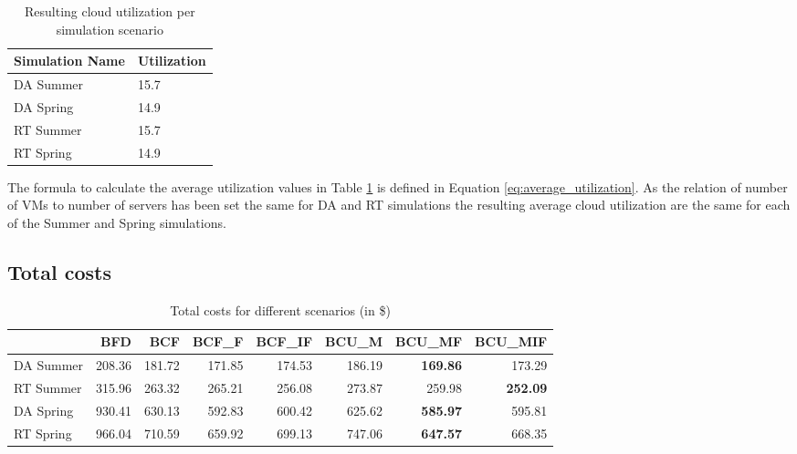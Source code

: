\begin{table}[htbp]
\centering
\begin{tabular}[\textwidth]{ll}
\toprule
	Simulation Name & Utilization  \\
\midrule
	DA Summer & 15.7 \\
	DA Spring & 14.9 \\
	RT Summer & 15.7 \\
	RT Spring & 14.9 \\
\bottomrule
\end{tabular}
\caption{Resulting cloud utilization per simulation scenario}
\label{tab:cloud_utilization_per_simulation_scenario}
\end{table}

The formula to calculate the average utilization values in Table \ref{tab:cloud_utilization_per_simulation_scenario} is defined in Equation \ref{eq:average_utilization}.
As the relation of number of VMs to number of servers has been set the same for DA and RT simulations the resulting average cloud utilization are the same for each of the Summer and Spring simulations. 

\subsection{Total costs}


\begin{table}[ht]
\centering
\begin{tabular}{lrrrrrrr}
\toprule
{} &     BFD &     BCF &   BCF\_F &  BCF\_IF &   BCU\_M &  BCU\_MF &  BCU\_MIF \\
\midrule
DA Summer &  208.36 &  181.72 &  171.85 &  174.53 &  186.19 &  \textbf{169.86} &   173.29 \\
RT Summer &  315.96 &  263.32 &  265.21 &  256.08 &  273.87 &  259.98 &   \textbf{252.09} \\
DA Spring &  930.41 &  630.13 &  592.83 &  600.42 &  625.62 &  \textbf{585.97} &   595.81 \\
RT Spring &  966.04 &  710.59 &  659.92 &  699.13 &  747.06 &  \textbf{647.57} &   668.35 \\
\bottomrule
\end{tabular}
\caption{Total costs for different scenarios (in \$)}
\end{table}

